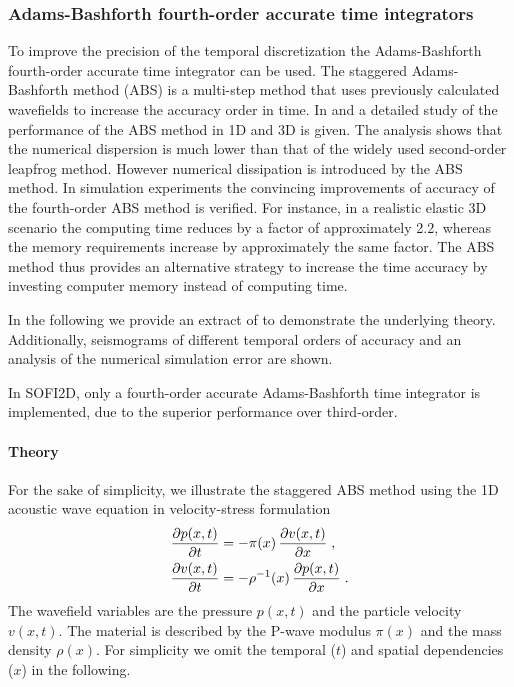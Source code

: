 \subsubsection{Adams-Bashforth fourth-order accurate time integrators}
\label{adams-bashforth}
To improve the precision of the temporal discretization the Adams-Bashforth fourth-order accurate time integrator can be used. 
The staggered Adams-Bashforth method (ABS) is a multi-step method that uses previously calculated wavefields to increase the accuracy order in time. In \citet{bohlen2015higher2} and \citet{bohlen2015higher} a detailed study of the performance of the ABS method in 1D and 3D is given. The analysis shows that the numerical dispersion is much lower than that of the widely used second-order leapfrog method. However numerical dissipation is introduced by the ABS method. In simulation experiments the convincing improvements of accuracy of the fourth-order ABS method is verified. For instance, in a realistic elastic 3D scenario the computing time reduces by a factor of approximately 2.2, whereas the memory requirements increase by approximately the same factor. The ABS method thus provides an alternative strategy to increase the time accuracy by investing computer memory instead of computing time.

In the following we provide an extract of \citet{bohlen2015higher2} to demonstrate the underlying theory. Additionally, seismograms of different temporal orders of accuracy and an analysis of the numerical simulation error are shown.

In SOFI2D, only a fourth-order accurate Adams-Bashforth time integrator is implemented, due to the superior performance over third-order.

\paragraph{Theory}
For the sake of simplicity, we illustrate the staggered ABS method using the 1D acoustic wave equation in velocity-stress formulation
\begin{subequations}
    \begin{align}
        \frac{\partial p(x,t)}{\partial t} &= - \pi (x)\,\frac{\partial v(x,t)}{\partial x}  \notag\;,\\
        \frac{\partial v(x,t)}{\partial t} &= -\rho^{-1}(x)\,\frac{\partial p(x,t)}{\partial x}\;.
        \label{waveequation}
    \end{align}
\end{subequations}
The wavefield variables are the pressure $p(x,t)$ and the particle velocity $v(x,t)$. The material is described by the P-wave modulus $\pi (x)$ and the mass density $\rho(x)$. For simplicity we omit the temporal ($t$) and spatial dependencies ($x$)  in the following.


